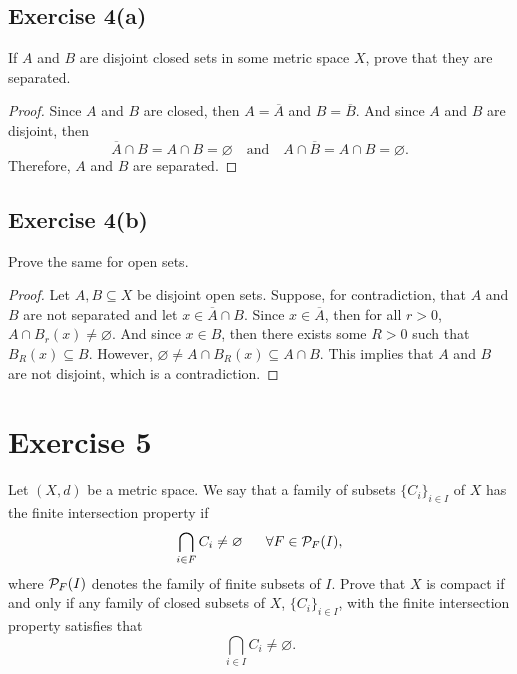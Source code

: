 \documentclass[12pt]{article}
\newenvironment{problem}
    {\begin{lrbox}{\mybox}\begin{minipage}{\textwidth-10pt}}
    {\end{minipage}\end{lrbox}\framebox[6.5in]{\usebox{\mybox}}}
\newcommand{\isp}[1]{\quad\text{#1}\quad}
\newcommand{\clo}[1]{\overline{#1}}
\let\emptyset\varnothing
\begin{document}
\subsection*{Exercise 4(a)}
\begin{problem}
    If $A$ and $B$ are disjoint closed sets in some metric space $X$, prove that they are separated. 
\end{problem}

\begin{proof}
    Since $A$ and $B$ are closed, then $A=\clo{A}$ and $B=\clo{B}$. And since $A$ and $B$ are disjoint, then
    \[\clo{A}\cap B = A\cap B = \emptyset \isp{and} A\cap\clo{B} = A\cap B = \emptyset.\]
    Therefore, $A$ and $B$ are separated.

\end{proof}

\subsection*{Exercise 4(b)}
\begin{problem}
    Prove the same for open sets.
\end{problem}

\begin{proof}
    Let $A,B\subseteq X$ be disjoint open sets. Suppose, for contradiction, that $A$ and $B$ are not separated and let $x\in\clo{A}\cap B$. Since $x\in\clo{A}$, then for all $r>0$, $A\cap B_r(x) \ne\emptyset$. And since $x\in B$, then there exists some $R>0$ such that $B_R(x)\subseteq B$. However,  $\emptyset \ne A\cap B_R(x)\subseteq A\cap B$. This implies that $A$ and $B$ are not disjoint, which is a contradiction.
    

\end{proof}

\section*{Exercise 5}
\begin{problem}
    Let $(X,d)$ be a metric space. We say that a family of subsets $\{C_i\}_{i\in I}$ of $X$ has the finite intersection property if 
    \[\bigcap_{i\in F} C_i \ne \emptyset\ \ \ \ \ \forall F \in {\cal P}_{F}(I),\]
    where ${\cal P}_{F}(I)$ denotes the family of finite subsets of $I$. Prove that $X$ is compact if and only if any family of closed subsets of $X$, $\{C_i\}_{i\in I}$, with the finite intersection property satisfies that
    \[\bigcap_{i \in I} C_i \ne \emptyset.\]
\end{problem}
\end{document}
